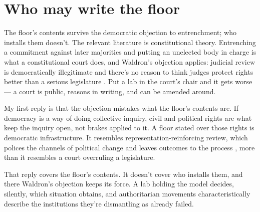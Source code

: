 \section{Who may write the floor}
\label{sec:14.1}
The floor's contents survive the democratic objection to entrenchment; who installs them doesn't. The relevant literature is constitutional theory. Entrenching a commitment against later majorities and putting an unelected body in charge is what a constitutional court does, and Waldron's objection applies: judicial review is democratically illegitimate and there's no reason to think judges protect rights better than a serious legislature \autocite{waldron2006core}. Put a lab in the court's chair and it gets worse — a court is public, reasons in writing, and can be amended around.

My first reply is that the objection mistakes what the floor's contents are. If democracy is a way of doing collective inquiry, civil and political rights are what keep the inquiry open, not brakes applied to it. A floor stated over those rights is democratic infrastructure. It resembles representation-reinforcing review, which polices the channels of political change and leaves outcomes to the process \autocite{ely1980democracy}, more than it resembles a court overruling a legislature.

That reply covers the floor's contents. It doesn't cover who installs them, and there Waldron's objection keeps its force. A lab holding the model decides, silently, which situation obtains, and authoritarian movements characteristically describe the institutions they're dismantling as already failed.


